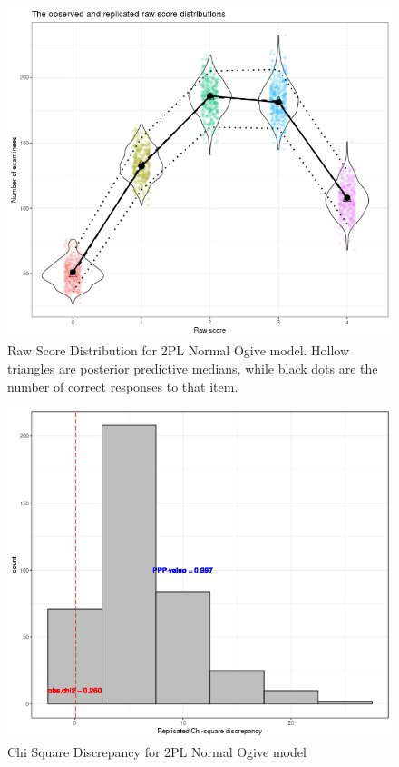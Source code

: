 \documentclass[12pt]{article}
\begin{document}
\begin{figure}[h]
\vspace{-0.5cm}
  \centering
  \includegraphics[width=1\columnwidth]{Plots/Plots_2PL_Ogive/raw_score_dist.png}
  \caption{Raw Score Distribution for 2PL Normal Ogive model. Hollow triangles are posterior predictive medians, while black dots are the number of correct responses to that item.}
  \label{2pl_ogive_raw_score}
\end{figure}

\begin{figure}[h]
\vspace{-0.5cm}
  \centering
  \includegraphics[width=1\columnwidth]{Plots/Plots_2PL_Ogive/chi_square.png}
  \caption{Chi Square Discrepancy for 2PL Normal Ogive model}
  \label{2pl_ogive_chi_squar}
\end{figure}
\end{document}
